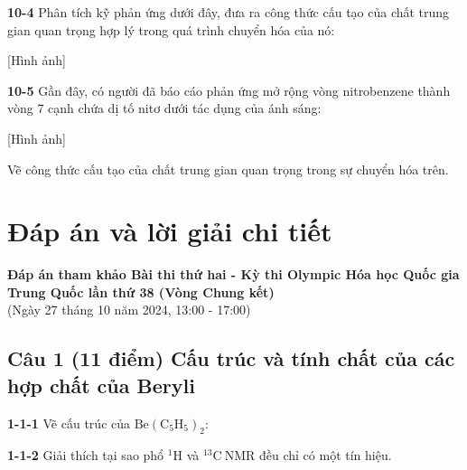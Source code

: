 \vspace{0.2cm}

\noindent
\textbf{10-4} Phân tích kỹ phản ứng dưới đây, đưa ra công thức cấu tạo của chất trung gian quan trọng hợp lý trong quá trình chuyển hóa của nó:

\begin{center}
    [Hình ảnh]
\end{center}

\vspace{0.2cm}

\noindent
\textbf{10-5} Gần đây, có người đã báo cáo phản ứng mở rộng vòng nitrobenzene thành vòng 7 cạnh chứa dị tố nitơ dưới tác dụng của ánh sáng:

\begin{center}
    [Hình ảnh]
\end{center}
Vẽ công thức cấu tạo của chất trung gian quan trọng trong sự chuyển hóa trên.


\section{Đáp án và lời giải chi tiết}
\begin{center}
    \Large\textbf{Đáp án tham khảo Bài thi thứ hai - Kỳ thi Olympic Hóa học Quốc gia Trung Quốc lần thứ 38 (Vòng Chung kết)} \\
    \normalsize (Ngày 27 tháng 10 năm 2024, 13:00 - 17:00)
\end{center}

\subsection{Câu 1 (11 điểm) Cấu trúc và tính chất của các hợp chất của Beryli}
\noindent
\textbf{1-1-1} Vẽ cấu trúc của $\mathrm{Be(C_5H_5)_2}$:


\noindent{}

\vspace{0.2cm}

\noindent
\textbf{1-1-2} Giải thích tại sao phổ $\mathrm{^1H}$ và $\mathrm{^{13}C\ NMR}$ đều chỉ có một tín hiệu.


\noindent{}

